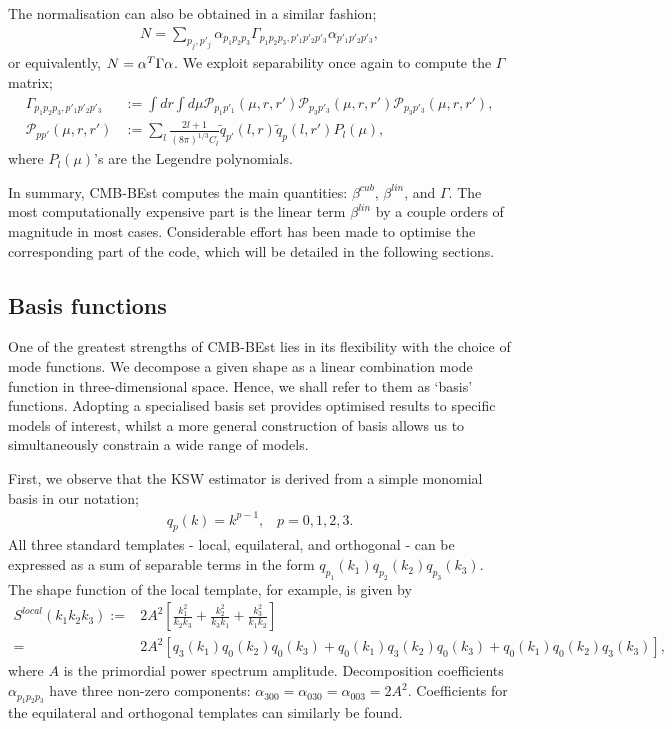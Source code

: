 The normalisation can also be obtained in a similar fashion;
\begin{align}
	N = \sum_{p_j, p'_j} \alpha_{p_1 p_2 p_3} \Gamma_{p_1 p_2 p_3, p'_1 p'_2 p'_3} \alpha_{p'_1 p'_2 p'_3}, \label{eqn:normlisation_from_gamma}
\end{align}
or equivalently, $N = \mathbf{\alpha}^T \Gamma \mathbf{\alpha}$. We exploit separability once again to compute the $\Gamma$ matrix;
\begin{align}
	\Gamma_{p_1 p_2 p_3, p'_1 p'_2 p'_3} &:= \int dr \int d\mu \mathcal{P}_{p_1 p'_1}(\mu, r, r') \mathcal{P}_{p_3 p'_3}(\mu, r, r') \mathcal{P}_{p_3 p'_3}(\mu, r, r'), 	\label{def:gamma} 	\\
	\mathcal{P}_{p p'}(\mu, r, r') &:= \sum_l \frac{2l+1}{(8\pi)^{1/3} C_l} \tilde{q}_{p'}(l,r) \tilde{q}_p(l,r') P_l(\mu),
\end{align}
where $P_l(\mu)$'s are the Legendre polynomials.

In summary, CMB-BEst computes the main quantities: $\beta^{cub}$, $\beta^{lin}$, and $\Gamma$. The most computationally expensive part is the linear term $\beta^{lin}$ by a couple orders of magnitude in most cases. Considerable effort has been made to optimise the corresponding part of the code, which will be detailed in the following sections.

\subsection{Basis functions} \label{section:basis_functions}

One of the greatest strengths of CMB-BEst lies in its flexibility with the choice of mode functions. We decompose a given shape as a linear combination mode function in three-dimensional space. Hence, we shall refer to them as `basis' functions. Adopting a specialised basis set provides optimised results to specific models of interest, whilst a more general construction of basis allows us to simultaneously constrain a wide range of models.

First, we observe that the KSW estimator \cite{Komatsu2005} is derived from a simple monomial basis in our notation;
\begin{align}
	q_p(k) = k^{p-1}, \;\;\; p = 0, 1, 2, 3.
\end{align}
All three standard templates - local, equilateral, and orthogonal - can be expressed as a sum of separable terms in the form $q_{p_1}(k_1) q_{p_2}(k_2) q_{p_3}(k_3)$. The shape function of the local template, for example, is given by
\begin{align}
	S^{local}(k_1 k_2 k_3) :=& 2A^2 \left[ \frac{k_1^2}{k_2 k_3} + \frac{k_2^2}{k_3 k_1} + \frac{k_3^2}{k_1 k_2}  \right] \\
	=& 2A^2 \left[q_3(k_1)q_0(k_2)q_0(k_3) + q_0(k_1)q_3(k_2)q_0(k_3) + q_0(k_1)q_0(k_2)q_3(k_3) \right],
\end{align}
where $A$ is the primordial power spectrum amplitude. Decomposition coefficients $\alpha_{p_1 p_2 p_3}$ have three non-zero components: $\alpha_{300} = \alpha_{030} = \alpha_{003} = 2A^2$. Coefficients for the equilateral and orthogonal templates can similarly be found.

